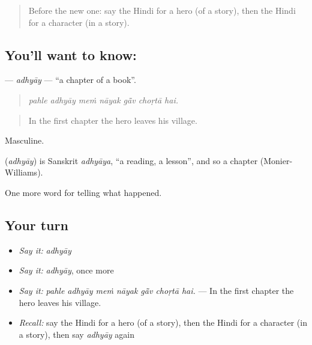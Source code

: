 \label{lesson:HI-C340-adhyay}



\begin{quote}
Before the new one: say the Hindi for a hero (of a story), then the Hindi for a character (in a story).
\end{quote}

\subsection*{You'll want to know: }
\textbf{} — \emph{adhyāy} — \textquotedblleft{}a chapter of a book\textquotedblright{}.

\begin{quote}
      
\end{quote}

\begin{quote}
\emph{pahle adhyāy meṁ nāyak gā̃v choṛtā hai.}
\end{quote}

\begin{quote}
In the first chapter the hero leaves his village.
\end{quote}

Masculine.

\begin{cousinweb}
\textbf{} (\emph{adhyāy}) is Sanskrit \emph{adhyāya}, \textquotedblleft{}a reading, a lesson\textquotedblright{}, and so a chapter (Monier-Williams).
\end{cousinweb}

\begin{grammarlens}[title={What you've built}]
One more word for telling what happened.
\end{grammarlens}

\subsection*{Your turn}
\begin{itemize}
\raggedright
  \item \emph{Say it:} \emph{adhyāy}
  \item \emph{Say it:} \emph{adhyāy}, once more
  \item \emph{Say it:} \emph{pahle adhyāy meṁ nāyak gā̃v choṛtā hai.} — In the first chapter the hero leaves his village.
  \item \emph{Recall:} say the Hindi for a hero (of a story), then the Hindi for a character (in a story), then say \emph{adhyāy} again
\end{itemize}

